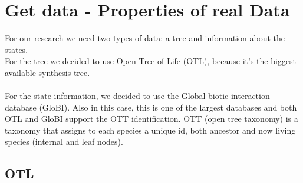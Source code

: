   \section{Get data - Properties of real Data}
    For our research we need two types of data: a tree and information about the states. \\
    For the tree we decided to use Open Tree of Life (OTL), because it's the biggest available synthesis 
      tree. \\
     \\
    For the state information, we decided to use the Global biotic interaction database (GloBI). Also in 
      this case, this is one of the largest databases and both OTL and GloBI support the OTT 
      identification. OTT (open tree taxonomy) is a taxonomy that assigns to each species a unique id, 
      both ancestor and now living species (internal and leaf nodes).

    \subsection{OTL}

